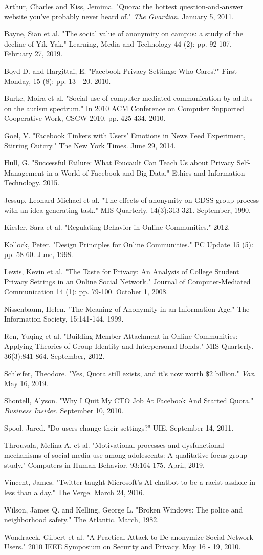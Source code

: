 \documentclass[class=book, crop=false]{standalone}
\begin{document}
Arthur, Charles and Kiss, Jemima. "Quora: the hottest question-and-answer website you've probably never heard of." \textit{The Guardian}. January 5, 2011.

Bayne, Sian et al. "The social value of anonymity on campus: a study of the decline of Yik Yak." Learning, Media and Technology 44 (2): pp. 92-107. February 27, 2019.

Boyd D. and Hargittai, E. "Facebook Privacy Settings: Who Cares?" First Monday, 15 (8): pp. 13 - 20. 2010.

Burke, Moira et al. "Social use of computer-mediated communication by adults on the autism spectrum." In 2010 ACM Conference on Computer Supported Cooperative Work, CSCW 2010. pp. 425-434. 2010.

Goel, V. "Facebook Tinkers with Users' Emotions in News Feed Experiment, Stirring Outcry." The New York Times. June 29, 2014.

Hull, G. "Successful Failure: What Foucault Can Teach Us about Privacy Self-Management in a World of Facebook and Big Data." Ethics and Information Technology. 2015.

Jessup, Leonard Michael et al. "The effects of anonymity on GDSS group process with an idea-generating task." MIS Quarterly. 14(3):313-321. September, 1990.

Kiesler, Sara et al. "Regulating Behavior in Online Communities." 2012.

Kollock, Peter. "Design Principles for Online Communities." PC Update 15 (5): pp. 58-60. June, 1998.

Lewis, Kevin et al. "The Taste for Privacy: An Analysis of College Student Privacy Settings in an Online Social Network." Journal of Computer-Mediated Communication 14 (1): pp. 79-100. October 1, 2008.

Nissenbaum, Helen. "The Meaning of Anonymity in an Information Age." The Information Society, 15:141-144. 1999.

Ren, Yuqing et al. "Building Member Attachment in Online Communities: Applying Theories of Group Identity and Interpersonal Bonds." MIS Quarterly. 36(3):841-864. September, 2012.

Schleifer, Theodore. "Yes, Quora still exists, and it's now worth \$2 billion." \textit{Vox}. May 16, 2019.

Shontell, Alyson. "Why I Quit My CTO Job At Facebook And Started Quora." \textit{Business Insider}. September 10, 2010.

Spool, Jared. "Do users change their settings?" UIE. September 14, 2011.

Throuvala, Melina A. et al. "Motivational processes and dysfunctional mechanisms of social media use among adolescents: A qualitative focus group study." Computers in Human Behavior. 93:164-175. April, 2019.

Vincent, James. "Twitter taught Microsoft's AI chatbot to be a racist asshole in less than a day." The Verge. March 24, 2016. 

Wilson, James Q. and Kelling, George L. "Broken Windows: The police and neighborhood safety." The Atlantic. March, 1982.

Wondracek, Gilbert et al. "A Practical Attack to De-anonymize Social Network Users." 2010 IEEE Symposium on Security and Privacy. May 16 - 19, 2010.
\end{document}
